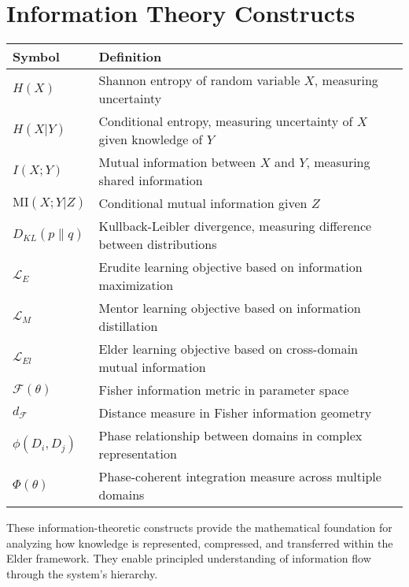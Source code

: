 \chapter*{Information Theory Constructs}

\begin{center}
\begin{tabular}{>{\centering\arraybackslash}p{3cm} p{10cm}}
\hline
\textbf{Symbol} & \textbf{Definition} \\
\hline
$H(X)$ & Shannon entropy of random variable $X$, measuring uncertainty \\
$H(X|Y)$ & Conditional entropy, measuring uncertainty of $X$ given knowledge of $Y$ \\
$I(X;Y)$ & Mutual information between $X$ and $Y$, measuring shared information \\
$\text{MI}(X;Y|Z)$ & Conditional mutual information given $Z$ \\
$D_{KL}(p \| q)$ & Kullback-Leibler divergence, measuring difference between distributions \\
$\mathcal{L}_E$ & Erudite learning objective based on information maximization \\
$\mathcal{L}_M$ & Mentor learning objective based on information distillation \\
$\mathcal{L}_{El}$ & Elder learning objective based on cross-domain mutual information \\
$\mathcal{F}(\theta)$ & Fisher information metric in parameter space \\
$d_{\mathcal{F}}$ & Distance measure in Fisher information geometry \\
$\phi(D_i, D_j)$ & Phase relationship between domains in complex representation \\
$\Phi(\theta)$ & Phase-coherent integration measure across multiple domains \\
\hline
\end{tabular}
\end{center}

\vspace{1cm}
\begin{center}
These information-theoretic constructs provide the mathematical foundation for analyzing how knowledge is represented, compressed, and transferred within the Elder framework. They enable principled understanding of information flow through the system's hierarchy.
\end{center}

